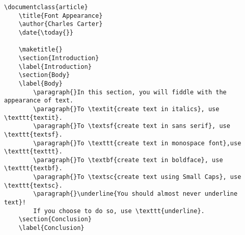         \begin{verbatim}
\documentclass{article}
    \title{Font Appearance}
    \author{Charles Carter}
    \date{\today{}}
 
    \maketitle{}
    \section{Introduction}
    \label{Introduction}
    \section{Body}
    \label{Body}
        \paragraph{}In this section, you will fiddle with the appearance of text. 
        \paragraph{}To \textit{create text in italics}, use \texttt{textit}. 
        \paragraph{}To \textsf{create text in sans serif}, use \texttt{textsf}. 
        \paragraph{}To \texttt{create text in monospace font},use \texttt{texttt}. 
        \paragraph{}To \textbf{create text in boldface}, use \texttt{textbf}. 
        \paragraph{}To \textsc{create text using Small Caps}, use \texttt{textsc}. 
        \paragraph{}\underline{You should almost never underline text}! 
        If you choose to do so, use \texttt{underline}.
    \section{Conclusion}
    \label{Conclusion}
    
        \end{verbatim}

